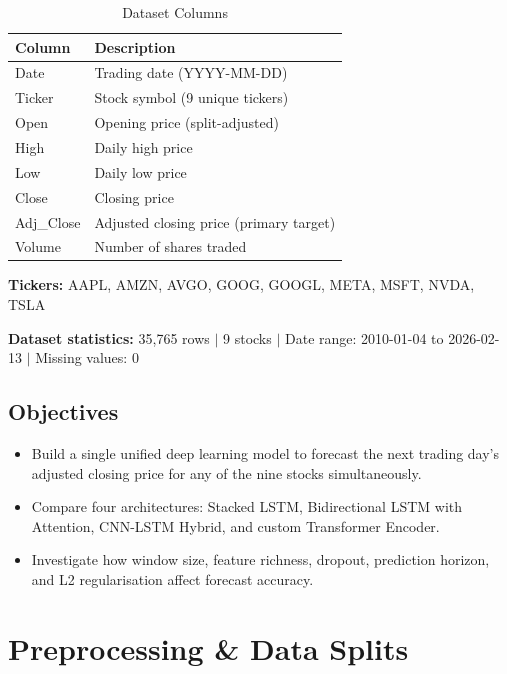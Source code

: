 \documentclass[12pt, a4paper]{article}
\begin{document}
\vspace{8pt}
\begin{table}[H]
\caption{Dataset Columns}
\label{tab:dataset-cols}
\begin{tabularx}{\textwidth}{L{3.2cm} X}
\color{white}\textbf{Column} & \color{white}\textbf{Description} \\
\midrule
Date        & Trading date (YYYY-MM-DD) \\
Ticker      & Stock symbol (9 unique tickers) \\
Open        & Opening price (split-adjusted) \\
High        & Daily high price \\
Low         & Daily low price \\
Close       & Closing price \\
Adj\_Close  & Adjusted closing price (primary target) \\
Volume      & Number of shares traded \\
\bottomrule
\end{tabularx}
\end{table}

\textbf{Tickers:} AAPL, AMZN, AVGO, GOOG, GOOGL, META, MSFT, NVDA, TSLA

\textbf{Dataset statistics:} 35,765 rows $|$ 9 stocks $|$ Date range: 2010-01-04 to 2026-02-13 $|$ Missing values: 0

\subsection{Objectives}

\begin{itemize}
  \item Build a single unified deep learning model to forecast the next trading day's adjusted closing price for any of the nine stocks simultaneously.
  \item Compare four architectures: Stacked LSTM, Bidirectional LSTM with Attention, CNN-LSTM Hybrid, and custom Transformer Encoder.
  \item Investigate how window size, feature richness, dropout, prediction horizon, and L2 regularisation affect forecast accuracy.
\end{itemize}

\section{Preprocessing \& Data Splits}
\end{document}
